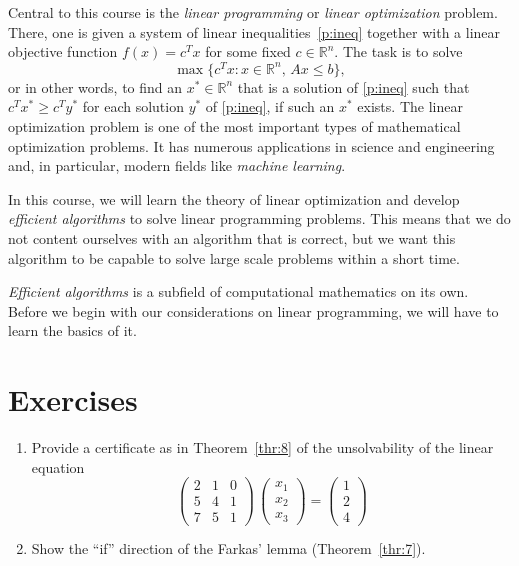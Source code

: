 Central to this course is the \emph{linear programming} or \emph{linear optimization} problem.  There, one is given a system of linear inequalities~\eqref{p:ineq} together with a linear objective function $f(x) = c^Tx$ for some fixed $c ∈ℝ^n$. The task is to solve 
\begin{equation}
  \label{eq:1}
  \max\{ c^Tx : x ∈ ℝ^n, \, Ax \leq b\}, 
\end{equation}
or in other words, to find an $x^* ∈ ℝ^n$ that is a solution of \eqref{p:ineq} such that $c^T x^* ≥ c^T y^*$ for each solution $y^*$ of \eqref{p:ineq}, if such an $x^*$ exists. 
The linear optimization problem is one of the most important types of mathematical optimization problems. It has numerous applications in science and engineering and, in particular, modern fields like \emph{machine learning}.

In this course, we will learn  the theory of linear optimization and develop \emph{efficient algorithms} to solve linear programming problems. This means that we do not content ourselves with an algorithm that is correct, but we want this algorithm to be capable to solve large scale problems within a short time. 

\emph{Efficient algorithms} is a subfield of computational mathematics on its own. Before we begin with our considerations on linear programming, we will have to learn the basics of it. 






\section*{Exercises}

\begin{enumerate}[1)]
\item Provide a certificate as in Theorem~\ref{thr:8} of the unsolvability of the linear equation 
  \begin{displaymath}
    \begin{pmatrix}
      2 & 1 & 0 \\
      5 & 4 & 1 \\
      7 & 5 & 1
    \end{pmatrix} \,
    \begin{pmatrix}
      x_1 \\ x_2 \\ x_3 
    \end{pmatrix} =
    \begin{pmatrix}
      1\\2\\4
    \end{pmatrix}
  \end{displaymath}
\item Show the ``if'' direction of the Farkas' lemma (Theorem~\ref{thr:7}). 
\end{enumerate}



 

